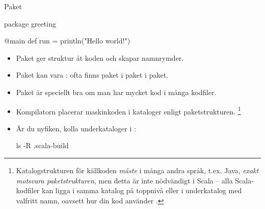 \begin{Slide}{Paket}\SlideFontSmall

\begin{Code}
package greeting

@main def run = println("Hello world!")
\end{Code}

\begin{itemize}
\item Paket  ger struktur åt koden och skapar namnrymder. 

\item Paket kan vara : ofta finns paket i paket i paket.

\item Paket är speciellt bra om man har mycket kod i många kodfiler. 

\item Kompilatorn placerar maskinkoden i kataloger enligt paketstrukturen.%
\footnote{\SlideFontTiny Katalogstrukturen för källkoden \emph{måste} i många andra språk, t.ex. Java, \emph{exakt motsvara paketstrukturen}, men detta är inte nödvändigt i Scala -- alla Scala-kodfiler kan ligga i samma katalog på toppnivå eller i underkatalog med valfritt namn, oavsett hur din kod använder .} 
\item[] Är du nyfiken, kolla underkataloger i :
\begin{REPLsmall}
ls -R .scala-build
\end{REPLsmall}

\end{itemize}


\end{Slide}

